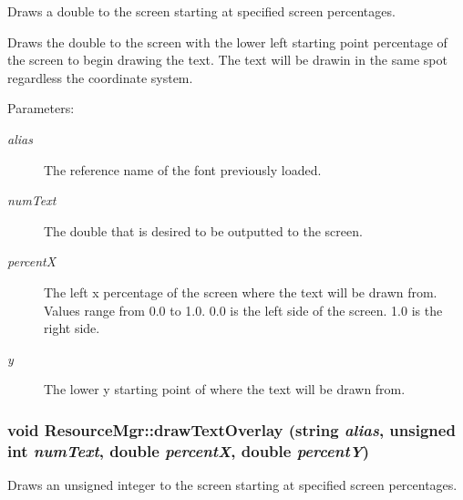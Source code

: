 Draws a double to the screen starting at specified screen percentages. 

Draws the double to the screen with the lower left starting point percentage of the screen to begin drawing the text. The text will be drawin in the same spot regardless the coordinate system. \begin{Desc}
\item[Parameters:]
\begin{description}
\item[{\em alias}]The reference name of the font previously loaded. \item[{\em numText}]The double that is desired to be outputted to the screen. \item[{\em percentX}]The left x percentage of the screen where the text will be drawn from. Values range from 0.0 to 1.0. 0.0 is the left side of the screen. 1.0 is the right side. \item[{\em y}]The lower y starting point of where the text will be drawn from. \end{description}
\end{Desc}
\hypertarget{class_resource_mgr_180e76776a6818756cfacb4fe0c2e430}{
\subsubsection[{drawTextOverlay}]{\setlength{\rightskip}{0pt plus 5cm}void ResourceMgr::drawTextOverlay (string {\em alias}, \/  unsigned int {\em numText}, \/  double {\em percentX}, \/  double {\em percentY})}}
\label{class_resource_mgr_180e76776a6818756cfacb4fe0c2e430}


Draws an unsigned integer to the screen starting at specified screen percentages. 

